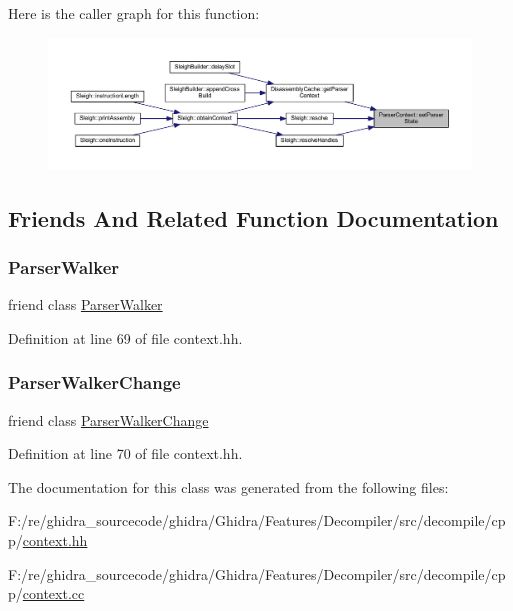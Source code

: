 Here is the caller graph for this function\+:
\nopagebreak
\begin{figure}[H]
\begin{center}
\leavevmode
\includegraphics[width=350pt]{class_parser_context_a49b8c4b331d6dad48a146c0675bf08c6_icgraph}
\end{center}
\end{figure}


\subsection{Friends And Related Function Documentation}
\mbox{\label{class_parser_context_a556db40b9849665da81ef5456e1d45c0}} 
\subsubsection{\texorpdfstring{ParserWalker}{ParserWalker}}
{\footnotesize\ttfamily friend class \mbox{\hyperlink{class_parser_walker}{Parser\+Walker}}\hspace{0.3cm}{\ttfamily [friend]}}



Definition at line 69 of file context.\+hh.

\mbox{\label{class_parser_context_ac7f0ef2000854fe3bbf14fe58f7d3f1d}} 
\subsubsection{\texorpdfstring{ParserWalkerChange}{ParserWalkerChange}}
{\footnotesize\ttfamily friend class \mbox{\hyperlink{class_parser_walker_change}{Parser\+Walker\+Change}}\hspace{0.3cm}{\ttfamily [friend]}}



Definition at line 70 of file context.\+hh.



The documentation for this class was generated from the following files\+:\begin{DoxyCompactItemize}
\item 
F\+:/re/ghidra\+\_\+sourcecode/ghidra/\+Ghidra/\+Features/\+Decompiler/src/decompile/cpp/\mbox{\hyperlink{context_8hh}{context.\+hh}}\item 
F\+:/re/ghidra\+\_\+sourcecode/ghidra/\+Ghidra/\+Features/\+Decompiler/src/decompile/cpp/\mbox{\hyperlink{context_8cc}{context.\+cc}}\end{DoxyCompactItemize}
